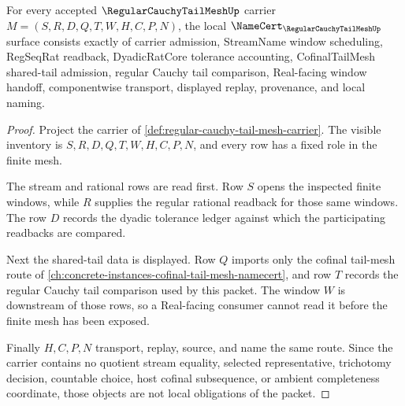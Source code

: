 \begin{theorem}
\label{thm:regular-cauchy-tail-mesh-namecert-obligations}
For every accepted $\RegularCauchyTailMeshUp$ carrier $M=(S,R,D,Q,T,W,H,C,P,N)$, the local $\NameCert_{\RegularCauchyTailMeshUp}$ surface consists exactly of carrier admission, StreamName window scheduling, RegSeqRat readback, DyadicRatCore tolerance accounting, CofinalTailMesh shared-tail admission, regular Cauchy tail comparison, Real-facing window handoff, componentwise transport, displayed replay, provenance, and local naming.
\end{theorem}
\begin{proof}
Project the carrier of \autoref{def:regular-cauchy-tail-mesh-carrier}. The visible inventory is $S,R,D,Q,T,W,H,C,P,N$, and every row has a fixed role in the finite mesh.

The stream and rational rows are read first. Row $S$ opens the inspected finite windows, while $R$ supplies the regular rational readback for those same windows. The row $D$ records the dyadic tolerance ledger against which the participating readbacks are compared.

Next the shared-tail data is displayed. Row $Q$ imports only the cofinal tail-mesh route of \autoref{ch:concrete-instances-cofinal-tail-mesh-namecert}, and row $T$ records the regular Cauchy tail comparison used by this packet. The window $W$ is downstream of those rows, so a Real-facing consumer cannot read it before the finite mesh has been exposed.

Finally $H,C,P,N$ transport, replay, source, and name the same route. Since the carrier contains no quotient stream equality, selected representative, trichotomy decision, countable choice, host cofinal subsequence, or ambient completeness coordinate, those objects are not local obligations of the packet.
\end{proof}

